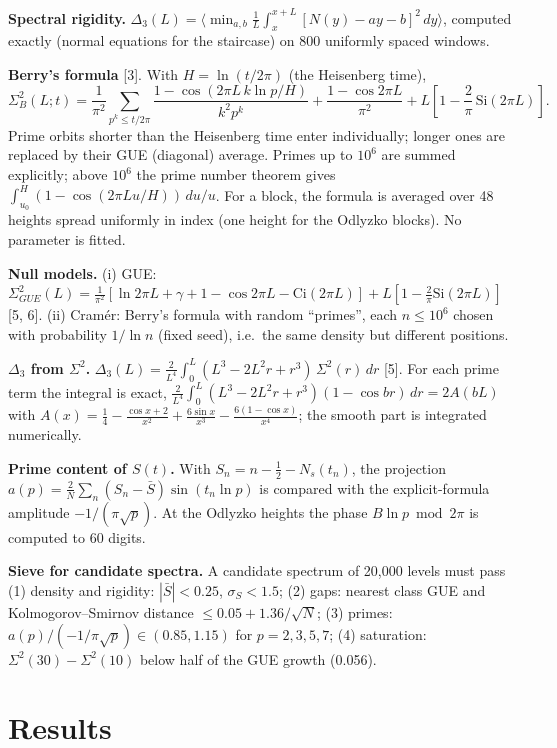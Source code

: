 \documentclass[11pt]{article}
\begin{document}
\textbf{Spectral rigidity.}
\(\Delta_3(L) = \langle \min_{a,b} \frac{1}{L}\int_x^{x+L}[N(y) - a y - b]^2\,dy \rangle\),
computed exactly (normal equations for the staircase) on 800 uniformly
spaced windows.

\textbf{Berry's formula} {[}3{]}. With \(H = \ln(t/2\pi)\) (the
Heisenberg time),
\[\Sigma^2_B(L; t) = \frac{1}{\pi^2}\sum_{p^k \le t/2\pi} \frac{1 - \cos(2\pi L\, k \ln p / H)}{k^2 p^k} + \frac{1 - \cos 2\pi L}{\pi^2} + L\left[1 - \frac{2}{\pi}\,\mathrm{Si}(2\pi L)\right].\]
Prime orbits shorter than the Heisenberg time enter individually; longer
ones are replaced by their GUE (diagonal) average. Primes up to \(10^6\)
are summed explicitly; above \(10^6\) the prime number theorem gives
\(\int_{u_0}^{H} (1 - \cos(2\pi L u/H))\,du/u\). For a block, the
formula is averaged over 48 heights spread uniformly in index (one
height for the Odlyzko blocks). No parameter is fitted.

\textbf{Null models.} (i) GUE:
\(\Sigma^2_{GUE}(L) = \frac{1}{\pi^2}[\ln 2\pi L + \gamma + 1 - \cos 2\pi L - \mathrm{Ci}(2\pi L)] + L[1 - \frac{2}{\pi}\mathrm{Si}(2\pi L)]\)
{[}5, 6{]}. (ii) Cramér: Berry's formula with random ``primes'', each
\(n \le 10^6\) chosen with probability \(1/\ln n\) (fixed seed),
i.e.~the same density but different positions.

\textbf{\(\Delta_3\) from \(\Sigma^2\).}
\(\Delta_3(L) = \frac{2}{L^4}\int_0^L (L^3 - 2L^2 r + r^3)\,\Sigma^2(r)\,dr\)
{[}5{]}. For each prime term the integral is exact,
\(\frac{2}{L^4}\int_0^L (L^3 - 2L^2 r + r^3)(1 - \cos br)\,dr = 2A(bL)\)
with
\(A(x) = \frac14 - \frac{\cos x + 2}{x^2} + \frac{6\sin x}{x^3} - \frac{6(1-\cos x)}{x^4}\);
the smooth part is integrated numerically.

\textbf{Prime content of \(S(t)\).} With
\(S_n = n - \frac12 - N_s(t_n)\), the projection
\(a(p) = \frac{2}{N}\sum_n (S_n - \bar S)\sin(t_n \ln p)\) is compared
with the explicit-formula amplitude \(-1/(\pi\sqrt p)\). At the Odlyzko
heights the phase \(B \ln p \bmod 2\pi\) is computed to 60 digits.

\textbf{Sieve for candidate spectra.} A candidate spectrum of 20,000
levels must pass (1) density and rigidity: \(|\bar S| < 0.25\),
\(\sigma_S < 1.5\); (2) gaps: nearest class GUE and Kolmogorov--Smirnov
distance \(\le 0.05 + 1.36/\sqrt N\); (3) primes:
\(a(p)/(-1/\pi\sqrt p) \in (0.85, 1.15)\) for \(p = 2, 3, 5, 7\); (4)
saturation: \(\Sigma^2(30) - \Sigma^2(10)\) below half of the GUE growth
(0.056).

\hypertarget{results}{%
\section{Results}\label{results}}
\end{document}
